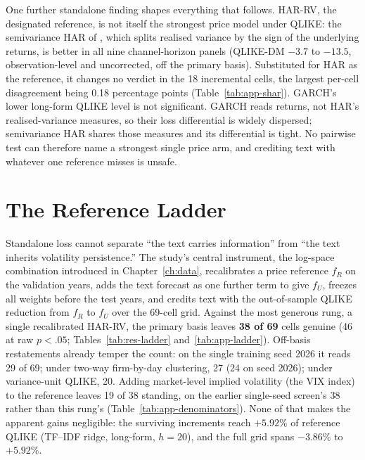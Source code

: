 One further standalone finding shapes everything that follows. HAR-RV, the designated reference, is not itself the strongest price model under QLIKE: the semivariance HAR of \cite{pattonsheppard2015shar}, which splits realised variance by the sign of the underlying returns, is better in all nine channel-horizon panels (QLIKE-DM $-3.7$ to $-13.5$, observation-level and uncorrected, off the primary basis). %
Substituted for HAR as the reference, it changes no verdict in the 18 incremental cells, the largest per-cell disagreement being 0.18 percentage points (Table~\ref{tab:app-shar}). %
GARCH's lower long-form QLIKE level is not significant. %
GARCH reads returns, not HAR's realised-variance measures, so their loss differential is widely dispersed; semivariance HAR shares those measures and its differential is tight.
No pairwise test can therefore name a strongest single price arm, and crediting text with whatever one reference misses is unsafe.

\section{The Reference Ladder}
\label{sec:res-ladder}

Standalone loss cannot separate ``the text carries information'' from ``the text inherits volatility persistence.'' The study's central instrument, the log-space combination introduced in Chapter~\ref{ch:data}, recalibrates a price reference $f_R$ on the validation years, adds the text forecast as one further term to give $f_U$, freezes all weights before the test years, and credits text with the out-of-sample QLIKE reduction from $f_R$ to $f_U$ over the 69-cell grid. %
Against the most generous rung, a single recalibrated HAR-RV, the primary basis leaves \textbf{38 of 69} cells genuine (46 at raw $p<.05$; Tables~\ref{tab:res-ladder} and~\ref{tab:app-ladder}). %
Off-basis restatements already temper the count: on the single training seed 2026 it reads 29 of 69; under two-way firm-by-day clustering, 27 (24 on seed 2026); under variance-unit QLIKE, 20. Adding market-level implied volatility (the VIX index) to the reference leaves 19 of 38 standing, on the earlier single-seed screen's 38 rather than this rung's (Table~\ref{tab:app-denominators}). %
None of that makes the apparent gains negligible: the surviving increments reach $+5.92\%$ of reference QLIKE (TF--IDF ridge, long-form, $h=20$), and the full grid spans $-3.86\%$ to $+5.92\%$. %

